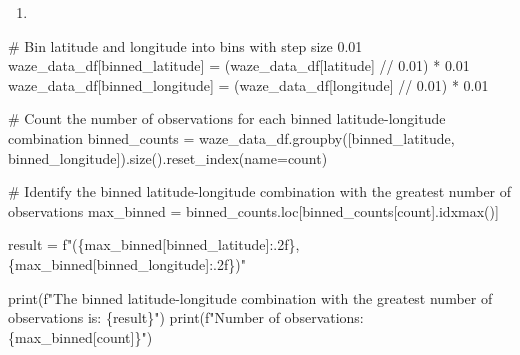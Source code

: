 \documentclass[
  letterpaper,
  DIV=11,
  numbers=noendperiod]{scrartcl}
\newenvironment{Shaded}{\begin{snugshade}}{\end{snugshade}}
\newcommand{\BuiltInTok}[1]{\textcolor[rgb]{0.00,0.23,0.31}{#1}}
\newcommand{\CommentTok}[1]{\textcolor[rgb]{0.37,0.37,0.37}{#1}}
\newcommand{\FloatTok}[1]{\textcolor[rgb]{0.68,0.00,0.00}{#1}}
\newcommand{\NormalTok}[1]{\textcolor[rgb]{0.00,0.23,0.31}{#1}}
\newcommand{\OperatorTok}[1]{\textcolor[rgb]{0.37,0.37,0.37}{#1}}
\newcommand{\SpecialCharTok}[1]{\textcolor[rgb]{0.37,0.37,0.37}{#1}}
\newcommand{\SpecialStringTok}[1]{\textcolor[rgb]{0.13,0.47,0.30}{#1}}
\newcommand{\StringTok}[1]{\textcolor[rgb]{0.13,0.47,0.30}{#1}}
\providecommand{\tightlist}{%
  \setlength{\itemsep}{0pt}\setlength{\parskip}{0pt}}\usepackage{longtable,booktabs,array}
\begin{document}
\begin{enumerate}
\def\labelenumi{\alph{enumi}.}
\setcounter{enumi}{1}
\tightlist
\item
\end{enumerate}

\begin{Shaded}
\begin{Highlighting}[]
\CommentTok{\# Bin latitude and longitude into bins with step size 0.01}
\NormalTok{waze\_data\_df[}\StringTok{\textquotesingle{}binned\_latitude\textquotesingle{}}\NormalTok{] }\OperatorTok{=}\NormalTok{ (waze\_data\_df[}\StringTok{\textquotesingle{}latitude\textquotesingle{}}\NormalTok{] }\OperatorTok{//} \FloatTok{0.01}\NormalTok{) }\OperatorTok{*} \FloatTok{0.01}
\NormalTok{waze\_data\_df[}\StringTok{\textquotesingle{}binned\_longitude\textquotesingle{}}\NormalTok{] }\OperatorTok{=}\NormalTok{ (waze\_data\_df[}\StringTok{\textquotesingle{}longitude\textquotesingle{}}\NormalTok{] }\OperatorTok{//} \FloatTok{0.01}\NormalTok{) }\OperatorTok{*} \FloatTok{0.01}
\end{Highlighting}
\end{Shaded}

\begin{Shaded}
\begin{Highlighting}[]
\CommentTok{\# Count the number of observations for each binned latitude{-}longitude combination}
\NormalTok{binned\_counts }\OperatorTok{=}\NormalTok{ waze\_data\_df.groupby([}\StringTok{\textquotesingle{}binned\_latitude\textquotesingle{}}\NormalTok{, }\StringTok{\textquotesingle{}binned\_longitude\textquotesingle{}}\NormalTok{]).size().reset\_index(name}\OperatorTok{=}\StringTok{\textquotesingle{}count\textquotesingle{}}\NormalTok{)}
\end{Highlighting}
\end{Shaded}

\begin{Shaded}
\begin{Highlighting}[]
\CommentTok{\# Identify the binned latitude{-}longitude combination with the greatest number of observations}
\NormalTok{max\_binned }\OperatorTok{=}\NormalTok{ binned\_counts.loc[binned\_counts[}\StringTok{\textquotesingle{}count\textquotesingle{}}\NormalTok{].idxmax()]}

\NormalTok{result }\OperatorTok{=} \SpecialStringTok{f"(}\SpecialCharTok{\{}\NormalTok{max\_binned[}\StringTok{\textquotesingle{}binned\_latitude\textquotesingle{}}\NormalTok{]}\SpecialCharTok{:.2f\}}\SpecialStringTok{, }\SpecialCharTok{\{}\NormalTok{max\_binned[}\StringTok{\textquotesingle{}binned\_longitude\textquotesingle{}}\NormalTok{]}\SpecialCharTok{:.2f\}}\SpecialStringTok{)"}

\BuiltInTok{print}\NormalTok{(}\SpecialStringTok{f"The binned latitude{-}longitude combination with the greatest number of observations is: }\SpecialCharTok{\{}\NormalTok{result}\SpecialCharTok{\}}\SpecialStringTok{"}\NormalTok{)}
\BuiltInTok{print}\NormalTok{(}\SpecialStringTok{f"Number of observations: }\SpecialCharTok{\{}\NormalTok{max\_binned[}\StringTok{\textquotesingle{}count\textquotesingle{}}\NormalTok{]}\SpecialCharTok{\}}\SpecialStringTok{"}\NormalTok{)}
\end{Highlighting}
\end{Shaded}
\end{document}
